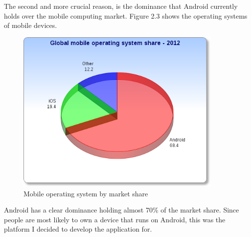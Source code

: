 The second and more crucial reason, is the dominance that Android currently holds over the mobile computing market. Figure 2.3 shows the operating systems of mobile devices. 

\begin{figure}[!h]
\centering
\includegraphics[width=0.9\textwidth]{Images/platform.png}
\caption{Mobile operating system by market share}
\label{fig:operatingsystem_piechart}
\end{figure}

Android has a clear dominance holding almost 70\% of the market share. Since people are most likely to own a device that runs on Android, this was the platform I decided to develop the application for.